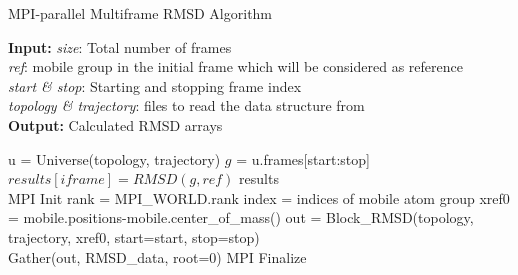 \begin{algorithm}[ht]
	\scriptsize
	\caption{MPI-parallel Multiframe RMSD Algorithm}
	\label{alg:RMSD_sug}
	\hspace*{\algorithmicindent} \textbf{Input:} \emph{size}: Total number of frames \\
	\hspace*{\algorithmicindent} \emph{ref}: mobile group in the initial frame which will be considered as reference \\
	\hspace*{\algorithmicindent} \emph{start \& stop}: Starting and stopping frame index\\
	\hspace*{\algorithmicindent} \emph{topology \& trajectory}: files to read the data structure from \\
	\hspace*{\algorithmicindent} \textbf{Output:} Calculated RMSD arrays
	\begin{algorithmic}[1]
		\State u = Universe(topology, trajectory)
		\State $g$ = u.frames[start:stop]
		\State $results[iframe] = RMSD(g, ref)$
		\EndFor
		\State \Return results
		\EndProcedure
		\\        
		\State MPI Init
		\State rank = MPI\_WORLD.rank
		\State index = indices of mobile atom group
		\State xref0 = mobile.positions-mobile.center\_of\_mass()
		\State out = Block\_RMSD(topology, trajectory, xref0, start=start, stop=stop)
		\\
		\State Gather(out, RMSD\_data, root=0)
		\State MPI Finalize
	\end{algorithmic}
\end{algorithm}

